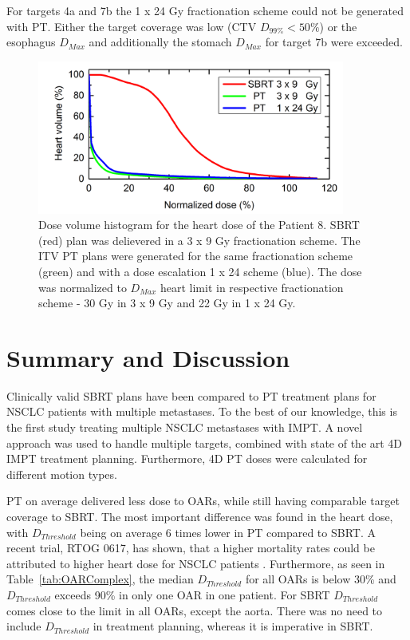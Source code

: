 For targets 4a and 7b the 1 x 24 Gy fractionation scheme could not be generated with PT. Either the target coverage was low (CTV $D_{99\%} < 50\%$) or the
esophagus $D_{Max}$ and additionally the stomach $D_{Max}$ for target 7b were exceeded.


\begin{figure}[H]
	\begin{center}
		\includegraphics[width=0.9\textwidth]{./ComplexPatients/Images/HeartDVH.png}
		\caption{Dose volume histogram for the heart dose of the Patient 8. SBRT (red) plan was delievered in a 3 x 9 Gy fractionation scheme. The ITV
		 PT plans were generated for the same fractionation scheme (green) and with a dose escalation 1 x 24 scheme (blue). The dose was normalized 
		 to $D_{Max}$ heart limit in respective fractionation scheme - 30 Gy in 3 x 9 Gy and 22 Gy in 1 x 24 Gy.}
		\label{Fig:heartDVH}
	\end{center}
\end{figure}
\newpage

\section{Summary and Discussion}

Clinically valid SBRT plans have been compared to PT treatment plans for NSCLC patients with multiple metastases. 
To the best of our knowledge, this is the first study treating multiple NSCLC metastases with IMPT. A novel approach was used to handle multiple targets, combined
with state of the art 4D IMPT treatment planning. Furthermore, 4D PT doses were calculated for different motion types. 

PT on average delivered less dose to OARs, while still having comparable target coverage to SBRT.
The most important difference was found in the heart dose, with $D_{Threshold}$ being on average 6 times lower in PT compared to SBRT. A recent trial, RTOG 0617, has shown,
that a higher mortality rates could be attributed to higher heart dose for NSCLC patients \cite{Bradley2015}. Furthermore, as seen in Table~\ref{tab:OARComplex}, the median
$D_{Threshold}$ for all OARs is below 30\% and $D_{Threshold}$ exceeds 90\% in only one OAR in one patient. For SBRT $D_{Threshold}$ comes close to the limit in all OARs,
except the aorta. There was no need to include $D_{Threshold}$ in treatment planning, whereas it is imperative in SBRT.

